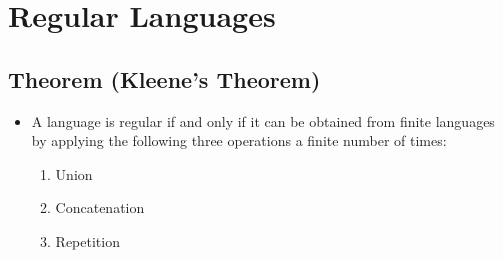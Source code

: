 
\section{Regular Languages}

\subsection{Theorem (Kleene's Theorem)}
\begin{itemize}
    \item A language is regular if and only if it can be obtained from finite languages by applying the following three operations a finite number of times:
    \begin{enumerate}
        \item Union
        \item Concatenation
        \item Repetition 
    \end{enumerate}
\end{itemize}

